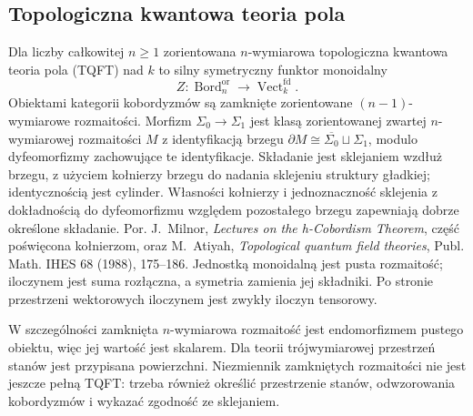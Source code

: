 \subsection{Topologiczna kwantowa teoria pola}

\begin{definicja}\label{cat:def:tf-tqft}
Dla liczby całkowitej $n\geq1$ zorientowana $n$-wymiarowa topologiczna kwantowa teoria pola (TQFT) nad $k$ to silny symetryczny funktor monoidalny
\[
 Z:\operatorname{Bord}_n^{\mathrm{or}}\longrightarrow
 \operatorname{Vect}^{\mathrm{fd}}_k.
\]
Obiektami kategorii kobordyzmów są zamknięte zorientowane $(n-1)$-wymiarowe rozmaitości. Morfizm $\Sigma_0\to\Sigma_1$ jest klasą zorientowanej zwartej $n$-wymiarowej rozmaitości $M$ z identyfikacją brzegu $\partial M\cong\overline{\Sigma_0}\sqcup\Sigma_1$, modulo dyfeomorfizmy zachowujące te identyfikacje. Składanie jest sklejaniem wzdłuż brzegu, z użyciem kołnierzy brzegu do nadania sklejeniu struktury gładkiej; identycznością jest cylinder. Własności kołnierzy i jednoznaczność sklejenia z dokładnością do dyfeomorfizmu względem pozostałego brzegu zapewniają dobrze określone składanie. Por. J.~Milnor, \emph{Lectures on the h-Cobordism Theorem}, część poświęcona kołnierzom, oraz M.~Atiyah, \emph{Topological quantum field theories}, Publ. Math. IHES 68 (1988), 175--186. Jednostką monoidalną jest pusta rozmaitość; iloczynem jest suma rozłączna, a symetria zamienia jej składniki. Po stronie przestrzeni wektorowych iloczynem jest zwykły iloczyn tensorowy.
\end{definicja}

W szczególności zamknięta $n$-wymiarowa rozmaitość jest endomorfizmem pustego obiektu, więc jej wartość jest skalarem. Dla teorii trójwymiarowej przestrzeń stanów jest przypisana powierzchni. Niezmiennik zamkniętych rozmaitości nie jest jeszcze pełną TQFT: trzeba również określić przestrzenie stanów, odwzorowania kobordyzmów i wykazać zgodność ze sklejaniem.

